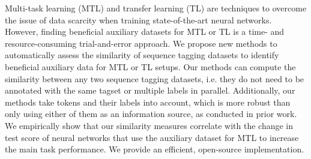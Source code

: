 Multi-task learning (MTL) and transfer learning (TL) are techniques to overcome the issue of data scarcity when training state-of-the-art neural networks. However, finding beneficial auxiliary datasets for MTL or TL is a time- and resource-consuming trial-and-error approach. We propose new methods to automatically assess the similarity of sequence tagging datasets to identify beneficial auxiliary data for MTL or TL setups. Our methods can compute the similarity between any two sequence tagging datasets, i.e. they do not need to be annotated with the same tagset or multiple labels in parallel. Additionally, our methods take tokens and their labels into account, which is more robust than only using either of them as an information source, as conducted in prior work. We empirically show that our similarity measures correlate with the change in test score of neural networks that use the auxiliary dataset for MTL to increase the main task performance. We provide an efficient, open-source implementation.
